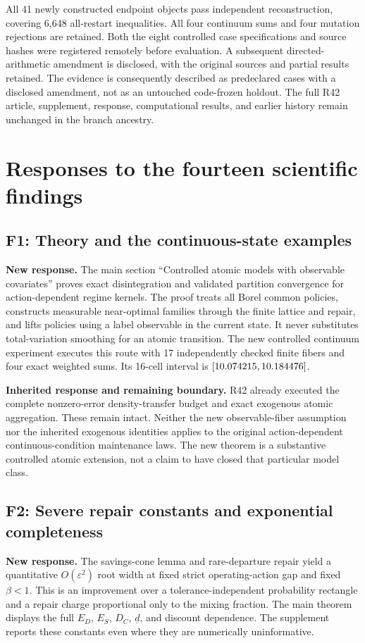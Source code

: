 All 41 newly constructed endpoint objects pass independent reconstruction, covering 6,648 all-restart inequalities. All four continuum sums and four mutation rejections are retained. Both the eight controlled case specifications and source hashes were registered remotely before evaluation. A subsequent directed-arithmetic amendment is disclosed, with the original sources and partial results retained. The evidence is consequently described as predeclared cases with a disclosed amendment, not as an untouched code-frozen holdout. The full R42 article, supplement, response, computational results, and earlier history remain unchanged in the branch ancestry.

\section{Responses to the fourteen scientific findings}
\subsection*{F1: Theory and the continuous-state examples}
\textbf{New response.} The main section ``Controlled atomic models with observable covariates'' proves exact disintegration and validated partition convergence for action-dependent regime kernels. The proof treats all Borel common policies, constructs measurable near-optimal families through the finite lattice and repair, and lifts policies using a label observable in the current state. It never substitutes total-variation smoothing for an atomic transition. The new controlled continuum experiment executes this route with 17 independently checked finite fibers and four exact weighted sums. Its 16-cell interval is $[10.074215,10.184476]$.

\textbf{Inherited response and remaining boundary.} R42 already executed the complete nonzero-error density-transfer budget and exact exogenous atomic aggregation. These remain intact. Neither the new observable-fiber assumption nor the inherited exogenous identities applies to the original action-dependent continuous-condition maintenance laws. The new theorem is a substantive controlled atomic extension, not a claim to have closed that particular model class.

\subsection*{F2: Severe repair constants and exponential completeness}
\textbf{New response.} The savings-cone lemma and rare-departure repair yield a quantitative $O(\varepsilon^2)$ root width at fixed strict operating-action gap and fixed $\beta<1$. This is an improvement over a tolerance-independent probability rectangle and a repair charge proportional only to the mixing fraction. The main theorem displays the full $E_D$, $E_S$, $D_C$, $\underline d$, and discount dependence. The supplement reports these constants even where they are numerically uninformative.

